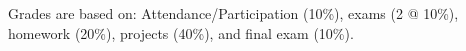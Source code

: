 
Grades are based on:
    Attendance/Participation (10\%), 
    exams (2 @ 10\%), 
    homework (20\%), 
    projects (40\%), and 
    final exam (10\%).   
